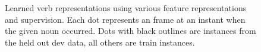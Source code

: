 \documentclass[11pt]{article}
\begin{document}
\begin{figure}[ht!]
%
%
\caption{Learned verb representations using various feature representations and supervision. Each dot represents an frame at an instant when the given noun occurred. Dots with black outlines are instances from the held out dev data, all others are train instances.}
\label{fig:verb-clusters}
\end{figure}
 

 
 
\end{document}
